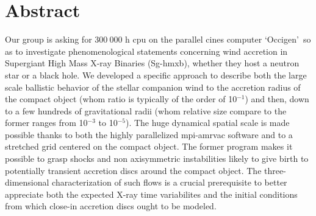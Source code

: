 \documentclass[
    a4paper, 
    12pt, onecolumn,
]{article}
\begin{document}
\section{Abstract}



\indent Our group is asking for  $300\ 000$ h {\sc cpu} on the parallel {\sc cines} computer \lq Occigen\rq\ so as to investigate phenomenological statements concerning wind accretion in Supergiant High Mass X-ray Binaries (Sg-{\sc hmxb}), whether they host a neutron star or a black hole. We developed a specific approach to describe both the large scale ballistic behavior of the stellar companion wind to the accretion radius of the compact object (whom ratio is typically of the order of 10$^{-1}$) and then, down to a few hundreds of gravitational radii (whom relative size compare to the former ranges from 10$^{-3}$ to 10$^{-5}$). The huge dynamical spatial scale is made possible thanks to both the highly parallelized {\sc mpi-amrvac} software and to a stretched grid centered on the compact object. The former program makes it possible to grasp shocks and non axisymmetric instabilities likely to give birth to potentially transient accretion discs around the compact object. The three-dimensional characterization of such flows is a crucial prerequisite to better appreciate both the expected X-ray time variabilites and the initial conditions from which close-in accretion discs ought to be modeled. \\
\end{document}
